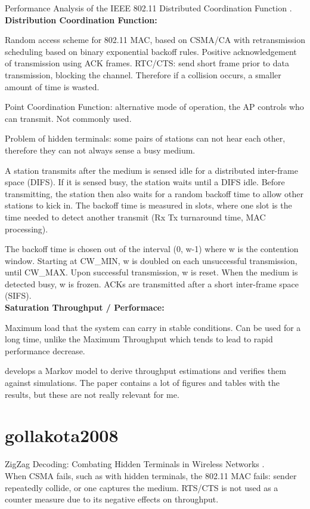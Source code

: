 Performance Analysis of the IEEE 802.11 Distributed Coordination Function \cite{bianchi2000}.\\

\textbf{Distribution Coordination Function:}

Random access scheme for 802.11 MAC, based on CSMA/CA with retransmission scheduling based on binary exponential backoff rules. Positive acknowledgement of transmission using ACK frames. RTC/CTS: send short frame prior to data transmission, blocking the channel. Therefore if a collision occurs, a smaller amount of time is wasted.

Point Coordination Function: alternative mode of operation, the AP controls who can transmit. Not commonly used.

Problem of hidden terminals: some pairs of stations can not hear each other, therefore they can not always sense a busy medium.

A station transmits after the medium is sensed idle for a distributed inter-frame space (DIFS). If it is sensed busy, the station waits until a DIFS idle. Before transmitting, the station then also waits for a random backoff time to allow other stations to kick in. The backoff time is measured in slots, where one slot is the time needed to detect another transmit (Rx Tx turnaround time, MAC processing).

The backoff time is chosen out of the interval (0, w-1) where w is the contention window. Starting at CW\_MIN, w is doubled on each unsuccessful transmission, until CW\_MAX. Upon successful transmission, w is reset. When the medium is detected busy, w is frozen. ACKs are transmitted after a short inter-frame space (SIFS).\\

\textbf{Saturation Throughput / Performace:}

Maximum load that the system can carry in stable conditions. Can be used for a long time, unlike the Maximum Throughput which tends to lead to rapid performance decrease.

\cite{bianchi2000} develops a Markov model to derive throughput estimations and verifies them against simulations. The paper contains a lot of figures and tables with the results, but these are not really relevant for me.



\section{gollakota2008}

ZigZag Decoding: Combating Hidden Terminals in Wireless Networks \cite{gollakota2008}.\\

When CSMA fails, such as with hidden terminals, the 802.11 MAC fails: sender repeatedly collide, or one captures the medium. RTS/CTS is not used as a counter measure due to its negative effects on throughput.


